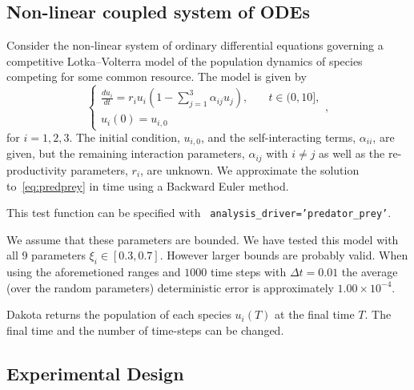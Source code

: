\subsection{Non-linear coupled system of ODEs}\label{sec:predator-prey}
Consider the non-linear system of ordinary differential equations
governing a competitive Lotka–Volterra model of the population
dynamics of species competing for some common resource. The model is given by
\begin{equation}\label{eq:predprey}
\begin{cases}
\frac{du_i}{dt} = r_iu_i\left(1-\sum_{j=1}^3\alpha_{ij}u_j\right), & \quad t\in (0,10],\\
u_i(0) = u_{i,0}
\end{cases},
\end{equation}
for $i = 1,2,3$.  The initial condition, $u_{i,0}$, and the
self-interacting terms, $\alpha_{ii}$, are given, but the remaining
interaction parameters, $\alpha_{ij}$ with $i\neq j$ as well as the
re-productivity parameters, $r_i$, are unknown.
We approximate the solution to~\eqref{eq:predprey} in time using a
Backward Euler method.

This test function can be specified with {\tt
  analysis\_driver='predator\_prey'}.

We assume that these parameters are bounded. We have tested this model
with all 9 parameters $\xi_i\in[0.3,0.7]$. However larger bounds are
probably valid.  When using the aforemetioned ranges and $1000$ time steps
with $\Delta t = 0.01$ the average (over the random parameters)
deterministic error is approximately $1.00\times10^{-4}$.

Dakota returns the population of each species $u_i(T)$ at the final
time $T$. The final time and the number of time-steps can be changed.

\subsection{Experimental Design}

